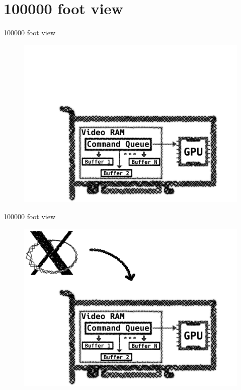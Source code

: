 \documentclass[10pt, compress, aspectratio=169]{beamer}
\begin{document}
\section{100000 foot view}
\begin{frame}{100000 foot view}
  \begin{figure}
    \centering
    \includegraphics[width=\linewidth,
                     height=0.8\textheight,
                     keepaspectratio]{no_drm_1}
  \end{figure}
\end{frame}

\begin{frame}{100000 foot view}
  \begin{figure}
    \centering
    \includegraphics[width=\linewidth,
                     height=0.8\textheight,
                     keepaspectratio]{no_drm_2}
  \end{figure}
\end{frame}
\end{document}
